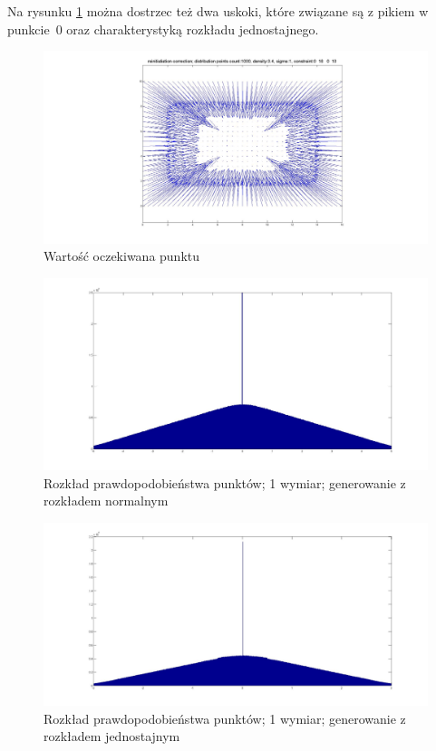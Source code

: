 \documentclass{mini}
\begin{document}
Na rysunku \ref{bladzenie:reinicjacja1dj} można dostrzec też dwa uskoki, które związane są z pikiem w punkcie~$0$ oraz charakterystyką rozkładu jednostajnego.

\begin{figure}[H]
\centering
\includegraphics[width=\textwidth]{reinitialization2dprzesuniecie}
\caption{Wartość oczekiwana punktu}
\end{figure}

\begin{figure}[H]
\centering
\includegraphics[width=\textwidth]{ri_n_20M_1__5_5}
\caption{Rozkład prawdopodobieństwa punktów; 1 wymiar; generowanie z rozkładem normalnym}
\end{figure}

\begin{figure}[H]
\centering
\includegraphics[width=\textwidth]{ri_j_20M_1__3_3}
\caption{Rozkład prawdopodobieństwa punktów; 1 wymiar; generowanie z rozkładem jednostajnym}
\label{bladzenie:reinicjacja1dj}
\end{figure}
\end{document}
